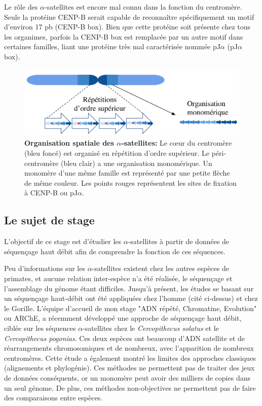 \documentclass[12pt,a4paper]{article}
\begin{document}
Le rôle des $\alpha$-satellites est encore mal connu dans la fonction du centromère. Seule la protéine CENP-B serait capable de reconnaître spécifiquement un motif d'environ 17 pb (CENP-B box). Bien que cette protéine soit présente chez tous les organimes, parfois la CENP-B box est remplacée par un autre motif dans certaines familles, liant une protéine très mal caractérisée nommée pJ$\alpha$ (pJ$\alpha$ box)\cite{Romanova1996}.

\begin{figure}
	\center
		\includegraphics[height=3.5cm, width=12cm]{img/AS_organization.png}
		\caption{\textbf{Organisation spatiale des $\alpha$-satellites:} Le cœur du centromère (bleu foncé) est organisé en répétition d'ordre supérieur. Le péri-centromère (bleu clair) a une organisation monomérique. Un monomère d'une même famille est représenté par une petite flèche de même couleur. Les points rouges représentent les sites de fixation à CENP-B ou pJ$\alpha$. \label{organisation_spatiale}}
\end{figure}

\subsection{Le sujet de stage}

L'objectif de ce stage est d'étudier les $\alpha$-satellites à partir de données de séquençage haut débit afin de comprendre la fonction de ces séquences. 

Peu d'informations sur les $\alpha$-satellites existent chez les autres espèces de primates, et aucune relation inter-espèce n'a été réalisée, le séquençage et l'assemblage du génome étant difficiles. Jusqu'à présent, les études se basant sur un séquençage haut-débit ont été appliquées chez l'homme (cité ci-dessus) et chez le Gorille. L'équipe d'accueil de mon stage "ADN répété, Chromatine, Evolution" ou ARChE, a récemment développé une approche de séquençage haut débit, ciblée sur les séquences $\alpha$-satellites chez le \textit{Cercopithecus solatus} et le \textit{Cercopithecus pogonias}. Ces deux espèces ont beaucoup d'ADN satellite et de réarrangements chromosomiques et de nombreux, avec l'apparition de nombreux centromères. Cette étude a également montré les limites des approches classiques (alignements et phylogénie). Ces méthodes ne permettent pas de traiter des jeux de données conséquents, or un monomère peut avoir des milliers de copies dans un seul génome. De plus, ces méthodes non-objectives ne permettent pas de faire des comparaisons entre espèces.
\end{document}
